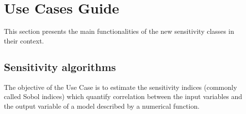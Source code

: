%

\section{Use Cases Guide}

This section presents the main functionalities of the new sensitivity classes in their context.\\



\subsection{Sensitivity algorithms}
The objective of the Use Case is to estimate the sensitivity indices (commonly called Sobol indices) which quantify correlation between the input variables and the output variable of a model described by a numerical function.\\

